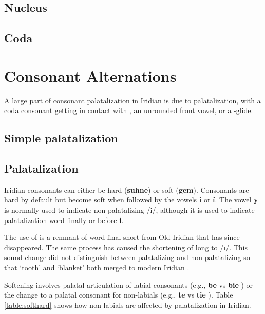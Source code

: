 \subsection{Nucleus}

\subsection{Coda}


\section{Consonant Alternations}

A large part of consonant palatalization in Iridian is due to palatalization, with a coda consonant getting in contact with , an unrounded front vowel, or a -glide.

\subsection{Simple palatalization}

\subsection{Palatalization}
\par Iridian consonants can either be hard (\textbf{suhne}) or soft (\textbf{gem}). Consonants are hard by default but become soft when followed by the vowels \textbf{i} or \textbf{í}. The vowel \textbf{y} is normally used to indicate non-palatalizing /i/, although it is used to indicate palatalization word-finally or before \textbf{i}.

\par The use of  is a remnant of word final short  from Old Iridian that has since disappeared. The same process has caused the shortening of long  to /ɪ/. This sound change did not distinguish between palatalizing and non-palatalizing  so that  `tooth' and  `blanket' both merged to modern Iridian  .

\par Softening involves palatal articulation of labial consonants (e.g., \textbf{be} \textipa{[bE]} vs \textbf{bie} \textipa{[b\sx{j}E]}) or the change to a palatal consonant for non-labials (e.g., \textbf{te} \textipa{[tE]} vs \textbf{tie} \textipa{[cE]}). Table \ref{table:softhard} shows how non-labials are affected by palatalization in Iridian.

